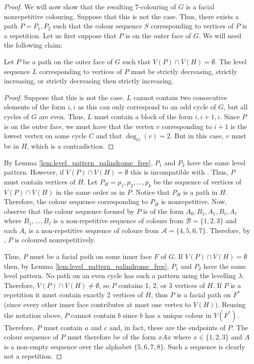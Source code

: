 \documentclass{patmorin}
\begin{document}
\begin{proof}
We will now show that the resulting 7-colouring of $G$ is a facial
nonrepetitive colouring. Suppose that this is not the case. Thus,
there exists a path $P=P_1,P_2$ such that the colour sequence $S$
corresponding to vertices of $P$ is a repetition. Let us first suppose
that $P$ is on the outer face of $G$. We will need the following claim:

 \begin{clm}
  Let $P$ be a path on the outer face of $G$ such that $V(P) \cap V(H) = \emptyset$. The level sequence $L$ corresponding to vertices of $P$ must be strictly decreasing, strictly increasing, or strictly decreasing then strictly increasing.
 \end{clm}
 \begin{proof}
 Suppose that this is not the case. $L$ cannot contain two consecutive
 elements of the form $i,i$ as this can only correspond to an odd cycle
 of $G$, but all cycles of $G$ are even. Thus, $L$ must contain a block
 of the form $i,i+1,i$. Since $P$ is on the outer face, we must have
 that the vertex $v$ corresponding to $i+1$ is the lowest vertex on some
 cycle $C$ and that $\deg_G(v)=2$. But in this case, $v$ must be in $H$,
 which is a contradiction.
 \end{proof}
 By Lemma \ref{lem:level_pattern_palindrome_free}, $P_1$ and $P_2$ have
 the same level pattern. However, if $V(P) \cap V(H) = \emptyset$ this
 is incompatible with .  Thus, $P$ must contain
 vertices of $H$. Let $P_H=p_1,p_2,\ldots,p_k$ be the sequence of vertices
 of $V(P) \cap V(H)$ in the same order as in $P$. Notice that $P_H$ is
 a path in $H$.  Therefore, the colour sequence corresponding to $P_H$
 is nonrepetitive.  Now, observe that the colour sequence formed by $P$
 is of the form $A_0,B_1,A_1,B_\ell,A_\ell$ where $B_1,\ldots,B_\ell$
 is a non-repetitive sequence of colours from $\mathcal{B}=\{1,2,3\}$ and
 each $A_i$ is a non-repetitive sequence of colours from $\mathcal{A}=\{4,5,6,7\}$.
 Therefore, by , $P$ is coloured nonrepetitively.

Thus, $P$ must be a facial path on some inner face $F$ of $G$.  If $V(P) \cap V(H) =
\emptyset$ then, by Lemma \ref{lem:level_pattern_palindrome_free},
$P_1$ and $P_2$ have the same level pattern.  No path on an even cycle
has such a pattern using the levelling $\lambda$.
Therefore, $V(P)\cap V(H)\neq\emptyset$, so $P$ contains 1, 2, or
3 vertices of $H$.  If $P$ is a repetition it must contain exactly
2 vertices of $H$, thus $P$ is a facial path on $F^*$ (since every
other inner face contributes at most one vertex to $V(H)$).  Reusing the
notation above, $P$ cannot contain $b$ since $b$ has a unique colour in
$V(F^*)$. Therefore, $P$ must contain $a$ and $c$ and, in fact, these are
the endpoints of $P$.  The colour sequence of $P$ must therefore be of
the form $xAx$ where $x\in\{1,2,3\}$ and $A$ is a non-empty sequence over
the alphabet $\{5,6,7,8\}$.  Such a sequence is clearly not a repetition.
\end{proof}
\end{document}

